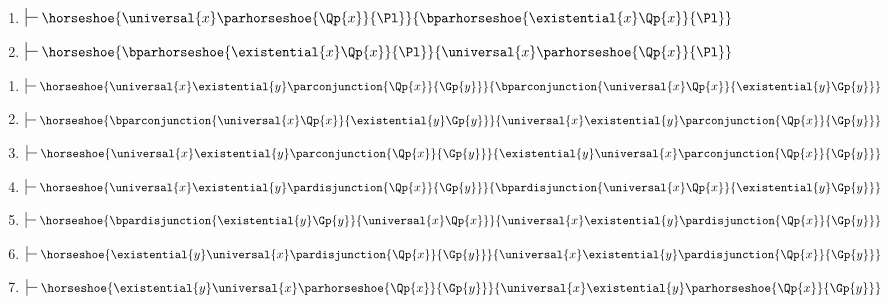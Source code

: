 \begin{multicols}{2}
\begin{enumerate}
\item $\sststile{}{}\horseshoe{\universal{\variable{x}}\parhorseshoe{\Qp{\variable{x}}}{\Pl}}{\bparhorseshoe{\existential{\variable{x}}\Qp{\variable{x}}}{\Pl}}$
\item $\sststile{}{}\horseshoe{\bparhorseshoe{\existential{\variable{x}}\Qp{\variable{x}}}{\Pl}}{\universal{\variable{x}}\parhorseshoe{\Qp{\variable{x}}}{\Pl}}$
\end{enumerate}
\end{multicols}
\begin{enumerate}[start=25]
\item $\sststile{}{}\horseshoe{\universal{\variable{x}}\existential{\variable{y}}\parconjunction{\Qp{\variable{x}}}{\Gp{\variable{y}}}}{\bparconjunction{\universal{\variable{x}}\Qp{\variable{x}}}{\existential{\variable{y}}\Gp{\variable{y}}}}$

\item $\sststile{}{}\horseshoe{\bparconjunction{\universal{\variable{x}}\Qp{\variable{x}}}{\existential{\variable{y}}\Gp{\variable{y}}}}{\universal{\variable{x}}\existential{\variable{y}}\parconjunction{\Qp{\variable{x}}}{\Gp{\variable{y}}}}$

\item $\sststile{}{}\horseshoe{\universal{\variable{x}}\existential{\variable{y}}\parconjunction{\Qp{\variable{x}}}{\Gp{\variable{y}}}}{\existential{\variable{y}}\universal{\variable{x}}\parconjunction{\Qp{\variable{x}}}{\Gp{\variable{y}}}}$

\item $\sststile{}{}\horseshoe{\universal{\variable{x}}\existential{\variable{y}}\pardisjunction{\Qp{\variable{x}}}{\Gp{\variable{y}}}}{\bpardisjunction{\universal{\variable{x}}\Qp{\variable{x}}}{\existential{\variable{y}}\Gp{\variable{y}}}}$

\item $\sststile{}{}\horseshoe{\bpardisjunction{\existential{\variable{y}}\Gp{\variable{y}}}{\universal{\variable{x}}\Qp{\variable{x}}}}{\universal{\variable{x}}\existential{\variable{y}}\pardisjunction{\Qp{\variable{x}}}{\Gp{\variable{y}}}}$

\item $\sststile{}{}\horseshoe{\existential{\variable{y}}\universal{\variable{x}}\pardisjunction{\Qp{\variable{x}}}{\Gp{\variable{y}}}}{\universal{\variable{x}}\existential{\variable{y}}\pardisjunction{\Qp{\variable{x}}}{\Gp{\variable{y}}}}$

\item $\sststile{}{}\horseshoe{\existential{\variable{y}}\universal{\variable{x}}\parhorseshoe{\Qp{\variable{x}}}{\Gp{\variable{y}}}}{\universal{\variable{x}}\existential{\variable{y}}\parhorseshoe{\Qp{\variable{x}}}{\Gp{\variable{y}}}}$


\end{enumerate}
